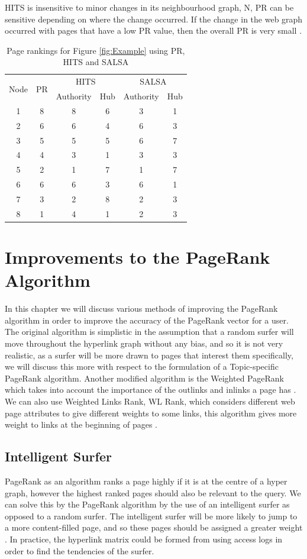 \documentclass[11pt]{report}
\begin{document}
{HITS is insensitive to minor changes in its neighbourhood graph, N, PR can be sensitive depending on where the change occurred. If the change in the web graph occurred with pages that have a low PR value, then the overall PR is very small \cite{bonato}.


\begin{table}[H] \caption{Page rankings for Figure \ref{fig:Example} using PR, HITS and SALSA }
 \centering
 \begin{tabular} {c| c| c| c| c| c} 
 \multirow{2}{*}{Node} & \multirow{2}{*}{PR} & \multicolumn{2}{|c|}{HITS} & \multicolumn{2}{|c}{SALSA} \\ [0.5ex] 
 {}&{}&Authority & Hub & Authority & Hub\\ 
 \hline
 1&8&8&6&3&1\\
 2&6&6&4&6&3\\
 3&5&5&5&6&7\\
 4&4&3&1&3&3\\
 5&2&1&7&1&7\\
 6&6&6&3&6&1\\
 7&3&2&8&2&3\\
 8&1&4&1&2&3\\
 \end{tabular}
 \label{Table: comparison}
\end{table}

\chapter{Improvements to the PageRank Algorithm} \label{chap:Improve}

In this chapter we will discuss various methods of improving the PageRank algorithm in order to improve the accuracy of the PageRank vector for a user. The original algorithm is simplistic in the assumption that a random surfer will move throughout the hyperlink graph without any bias, and so it is not very realistic, as a surfer will be more drawn to pages that interest them specifically, we will discuss this more with respect to the formulation of a Topic-specific PageRank algorithm. Another modified algorithm is the Weighted PageRank which takes into account the importance of the outlinks and inlinks a page has \cite{xing2004weighted}. We can also use Weighted Links Rank, WL Rank, which considers different web page attributes to give different weights to some links, this algorithm gives more weight to links at the beginning of pages \cite{baeza2004web}.

\section{Intelligent Surfer} \label{sec:intelligent}
PageRank as an algorithm ranks a page highly if it is at the centre of a hyper graph, however the highest ranked pages should also be relevant to the query. We can solve this by the PageRank algorithm by the use of an intelligent surfer as opposed to a random surfer. The intelligent surfer will be more likely to jump to a more content-filled page, and so these pages should be assigned a greater weight \cite{langville}. In practice, the hyperlink matrix could be formed from using access logs in order to find the tendencies of the surfer. 

}
\end{document}
